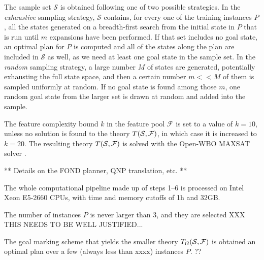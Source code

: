 \documentclass[letterpaper]{article} %
\begin{document}
The sample set $\mathcal{S}$ is obtained following one of two possible strategies.
In the \emph{exhaustive} sampling strategy,
$\mathcal{S}$ contains, for every one of the training instances $P$,
all the states generated on a breadth-first search from the initial state in $P$
that is run until $m$ expansions have been performed. If that set includes no goal state,
an optimal plan for $P$ is computed and all of the states along the plan are included in $\mathcal{S}$ as well,
as we need at least one goal state in the sample set.
%
In the \emph{random} sampling strategy, a large number $M$ of states are generated, potentially exhausting the full state space,
and then a certain number $m <\!< M$ of them is sampled uniformly at random. If no goal state is found among those $m$,
one random goal state from the larger set is drawn at random and added into the sample.

The feature complexity bound $k$ in the feature pool $\mathcal{F}$ is set to a value of $k=10$, unless no solution is found
to the theory $T({\cal S},{\cal F})$, in which case it is increased to $k=20$. 
The resulting theory $T({\cal S},{\cal F})$ is solved with the Open-WBO MAXSAT solver \cite{martins2014open}.

** Details on the FOND planner, QNP translation, etc. **

The whole computational pipeline made up of steps 1--6 is processed on Intel Xeon E5-2660 CPUs,
with time and memory cutoffs of 1h and 32GB.

The number of instances $P$ is never larger than $3$, and they are selected XXX THIS NEEDS TO BE WELL JUSTIFIED...



The goal marking scheme that  yields the smaller  theory $T_G({\cal S},{\cal F})$ is obtained an optimal plan over
a few (always less than xxxx) instances $P$. ??
\end{document}
